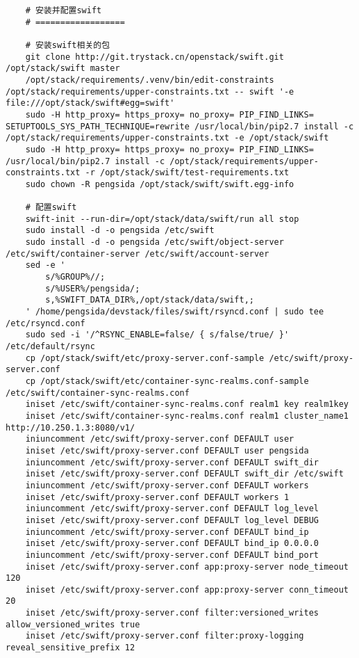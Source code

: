 \documentclass[a4paper,left=1.5cm,right=1.5cm,11pt]{article}
\begin{document}
\begin{lstlisting}
	# 安装并配置swift
	# ==================

	# 安装swift相关的包
	git clone http://git.trystack.cn/openstack/swift.git /opt/stack/swift master
	/opt/stack/requirements/.venv/bin/edit-constraints /opt/stack/requirements/upper-constraints.txt -- swift '-e file:///opt/stack/swift#egg=swift'
	sudo -H http_proxy= https_proxy= no_proxy= PIP_FIND_LINKS= SETUPTOOLS_SYS_PATH_TECHNIQUE=rewrite /usr/local/bin/pip2.7 install -c /opt/stack/requirements/upper-constraints.txt -e /opt/stack/swift
	sudo -H http_proxy= https_proxy= no_proxy= PIP_FIND_LINKS= /usr/local/bin/pip2.7 install -c /opt/stack/requirements/upper-constraints.txt -r /opt/stack/swift/test-requirements.txt
	sudo chown -R pengsida /opt/stack/swift/swift.egg-info

	# 配置swift
	swift-init --run-dir=/opt/stack/data/swift/run all stop
	sudo install -d -o pengsida /etc/swift
    sudo install -d -o pengsida /etc/swift/object-server /etc/swift/container-server /etc/swift/account-server
	sed -e '
		s/%GROUP%//;
		s/%USER%/pengsida/;
		s,%SWIFT_DATA_DIR%,/opt/stack/data/swift,;
	' /home/pengsida/devstack/files/swift/rsyncd.conf | sudo tee /etc/rsyncd.conf
	sudo sed -i '/^RSYNC_ENABLE=false/ { s/false/true/ }' /etc/default/rsync
	cp /opt/stack/swift/etc/proxy-server.conf-sample /etc/swift/proxy-server.conf
	cp /opt/stack/swift/etc/container-sync-realms.conf-sample /etc/swift/container-sync-realms.conf
    iniset /etc/swift/container-sync-realms.conf realm1 key realm1key
    iniset /etc/swift/container-sync-realms.conf realm1 cluster_name1 http://10.250.1.3:8080/v1/
    iniuncomment /etc/swift/proxy-server.conf DEFAULT user
    iniset /etc/swift/proxy-server.conf DEFAULT user pengsida
    iniuncomment /etc/swift/proxy-server.conf DEFAULT swift_dir
    iniset /etc/swift/proxy-server.conf DEFAULT swift_dir /etc/swift
    iniuncomment /etc/swift/proxy-server.conf DEFAULT workers
    iniset /etc/swift/proxy-server.conf DEFAULT workers 1
    iniuncomment /etc/swift/proxy-server.conf DEFAULT log_level
    iniset /etc/swift/proxy-server.conf DEFAULT log_level DEBUG
    iniuncomment /etc/swift/proxy-server.conf DEFAULT bind_ip
    iniset /etc/swift/proxy-server.conf DEFAULT bind_ip 0.0.0.0
    iniuncomment /etc/swift/proxy-server.conf DEFAULT bind_port
	iniset /etc/swift/proxy-server.conf app:proxy-server node_timeout 120
    iniset /etc/swift/proxy-server.conf app:proxy-server conn_timeout 20
    iniset /etc/swift/proxy-server.conf filter:versioned_writes allow_versioned_writes true
	iniset /etc/swift/proxy-server.conf filter:proxy-logging reveal_sensitive_prefix 12

\end{lstlisting}
\end{document}
